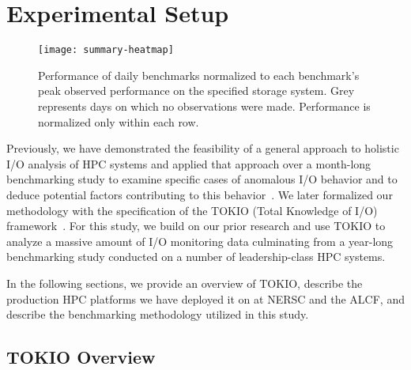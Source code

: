 \section{Experimental Setup}\label{sec:methods}

\begin{figure*}[t]
    \centering
    \texttt{[image: summary-heatmap]}
    \vspace{-.2in}
    \caption{Performance of daily benchmarks normalized to each benchmark's peak observed performance on the specified storage system.  Grey represents days on which no observations were made.  Performance is normalized only within each row.}
    \label{fig:summary-heatmap}
\end{figure*}




Previously, we have demonstrated the feasibility of a general approach to holistic I/O analysis of HPC systems and applied that approach over a month-long benchmarking study to examine specific cases of anomalous I/O behavior and to deduce potential factors contributing to this behavior~\cite{Lockwood2017}. We later formalized our methodology with the specification of the TOKIO (Total Knowledge of I/O) framework~\cite{Lockwood2018tokio}. For this study, we build on our prior research and use TOKIO to analyze a massive amount of I/O monitoring data culminating from a year-long benchmarking study conducted on a number of leadership-class HPC systems. 

In the following sections, we provide an overview of TOKIO, describe the production HPC platforms we have deployed it on at NERSC and the ALCF, and describe the benchmarking methodology  utilized in this study.

\subsection{TOKIO Overview}\label{sec:methods/tokio}

